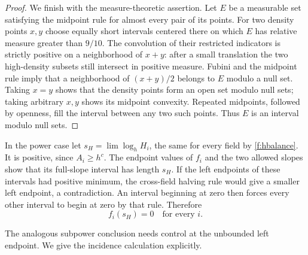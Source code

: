 \begin{proof}
We finish with the measure-theoretic assertion. Let $E$ be a
measurable set satisfying the midpoint rule for almost every pair
of its points. For two density points $x,y$ choose equally short
intervals centered there on which $E$ has relative measure greater
than $9/10$. The convolution of their restricted indicators is
strictly positive on a neighborhood of $x+y$: after a small
translation the two high-density subsets still intersect in
positive measure. Fubini and the midpoint rule imply that a
neighborhood of $(x+y)/2$ belongs to $E$ modulo a null set. Taking
$x=y$ shows that the density points form an open set modulo null
sets; taking arbitrary $x,y$ shows its midpoint convexity. Repeated
midpoints, followed by openness, fill the interval between any
two such points. Thus $E$ is an interval modulo null sets.
\end{proof}

In the power case let $s_H=\lim\log_h H_i$, the same for every field
by \eqref{f:hbalance}. It is positive, since $A_i\ge h^c$.
The endpoint values of $f_i$ and the two allowed slopes show that
its full-slope interval has length $s_H$. If the left endpoints
of these intervals had positive minimum, the cross-field halving
rule would give a smaller left endpoint, a contradiction. An
interval beginning at zero then forces every other interval to
begin at zero by that rule. Therefore
\begin{equation}\label{f:power-end}
 f_i(s_H)=0\quad\text{for every }i.
\end{equation}

The analogous subpower conclusion needs control at the unbounded
left endpoint. We give the incidence calculation explicitly.

